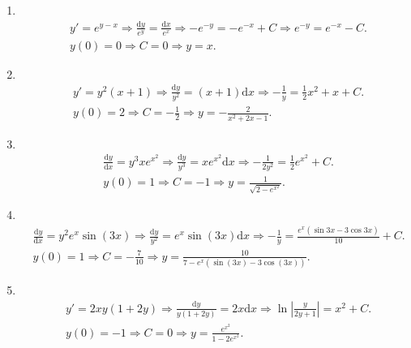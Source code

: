 \begin{solution}
    \begin{enumerate}
    \item[1.]\\
    \[
    \begin{aligned}
    &y'=e^{y-x}\Rightarrow \frac{\mathrm{d}y}{e^y}=\frac{\mathrm{d}x}{e^x}\Rightarrow-e^{-y}=-e^{-x}+C\Rightarrow e^{-y}=e^{-x}-C.\\
    &y(0)=0\Rightarrow C=0 \Rightarrow y=x.
    \end{aligned}
    \]

    \item[2.]\\
    \[
    \begin{aligned}
    &y'=y^2(x+1)\Rightarrow \frac{\mathrm{d}y}{y^2}=(x+1)\mathrm{d}x\Rightarrow -\frac{1}{y}=\frac{1}{2}x^2+x+C.\\
    &y(0)=2\Rightarrow C=-\frac{1}{2} \Rightarrow y=-\frac{2}{x^2+2x-1}.
    \end{aligned}
    \]

    \item[3.]\\
    \[
    \begin{aligned}
    &\frac{\mathrm{d}y}{\mathrm{d}x}=y^3xe^{x^2}\Rightarrow\frac{\mathrm{d}y}{y^3}=xe^{x^2}\mathrm{d}x\Rightarrow -\frac{1}{2y^2}=\frac{1}{2}e^{x^2}+C.\\
    &y(0)=1\Rightarrow C=-1\Rightarrow y=\frac{1}{\sqrt{2-e^{x^2}}}.
    \end{aligned}
    \]

    \item[4.]\\
    \[
    \begin{aligned}
    &\frac{\mathrm{d}y}{\mathrm{d}x}=y^2e^x\sin\left(3x\right)\Rightarrow \frac{\mathrm{d}y}{y^2}=e^x\sin\left(3x\right)\mathrm{d}x\Rightarrow -\frac{1}{y}=\frac{e^x\left(\sin{3x}-3\cos{3x}\right)}{10}+C.\\
    &y(0)=1\Rightarrow C=-\frac{7}{10}\Rightarrow y=\frac{10}{7-e^x(\sin(3x)-3\cos(3x))}.
    \end{aligned}
    \]

    \item[5.]\\
    \[
    \begin{aligned}
    &y'=2xy(1+2y)\Rightarrow \frac{\mathrm{d}y}{y(1+2y)}=2x\mathrm{d}x\Rightarrow \ln\left|\frac{y}{2y+1}\right|=x^2+C.\\
    &y(0)=-1\Rightarrow C=0\Rightarrow y=\frac{e^{x^2}}{1-2e^{x^2}}.
    \end{aligned}
    \]


\end{enumerate}
\end{solution}
